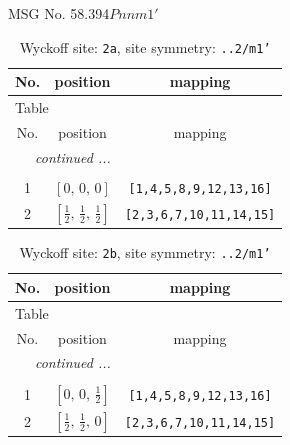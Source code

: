 \documentclass[fleqn,8pt]{jsarticle}
\begin{document}
\setcounter{MaxMatrixCols}{32}

\renewcommand{\tablename}{Table~}
\renewcommand{\figurename}{Figure~}
\begin{center}
\LARGE
MSG No. 58.394\quad$Pnnm1'$
\end{center}
\renewcommand{\arraystretch}{1.2}
\begin{longtable}{ccc}
\caption{Wyckoff site: {\tt 2a}, site symmetry: {\tt ..2/m1'}}
 \\
 \hline \hline
No. & position & mapping \\ \hline \endfirsthead

\multicolumn{2}{l}{\tablename\ \thetable{}} \\
 \hline \hline
No. & position & mapping \\ \hline \endhead

 \hline \hline
\multicolumn{2}{r}{\footnotesize\it continued ...} \\ \endfoot

 \hline \hline
\multicolumn{2}{r}{} \\ \endlastfoot

1 & $\left[ 0,\, 0,\, 0 \right]$ & {\tt [1,4,5,8,9,12,13,16]} \\ \hline
2 & $\left[ \frac{1}{2},\, \frac{1}{2},\, \frac{1}{2} \right]$ & {\tt [2,3,6,7,10,11,14,15]} \\
\end{longtable}
\renewcommand{\arraystretch}{1.2}
\begin{longtable}{ccc}
\caption{Wyckoff site: {\tt 2b}, site symmetry: {\tt ..2/m1'}}
 \\
 \hline \hline
No. & position & mapping \\ \hline \endfirsthead

\multicolumn{2}{l}{\tablename\ \thetable{}} \\
 \hline \hline
No. & position & mapping \\ \hline \endhead

 \hline \hline
\multicolumn{2}{r}{\footnotesize\it continued ...} \\ \endfoot

 \hline \hline
\multicolumn{2}{r}{} \\ \endlastfoot

1 & $\left[ 0,\, 0,\, \frac{1}{2} \right]$ & {\tt [1,4,5,8,9,12,13,16]} \\ \hline
2 & $\left[ \frac{1}{2},\, \frac{1}{2},\, 0 \right]$ & {\tt [2,3,6,7,10,11,14,15]} \\
\end{longtable}
\end{document}
